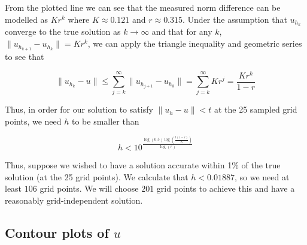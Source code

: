 \documentclass{article}
\numberwithin{equation}{section}
\theoremstyle{definition}
\begin{document}


From the plotted line we can see that the measured norm difference can be modelled as $Kr^k$ where $K \approx 0.121$ and $r \approx 0.315$. Under the assumption that $u_{h_k}$ converge to the true solution as $k \to \infty$ and that for any $k$, $\|u_{h_{k+1}} - u_{h_k}\| = Kr^k$, we can apply the triangle inequality and geometric series to see that

\begin{equation}
    \|u_{h_k} - u\| \leq \sum_{j=k}^{\infty} \|u_{h_{j+1}} - u_{h_{k}}\| = \sum_{j=k}^{\infty} Kr^j = \frac{Kr^k}{1-r}
\end{equation}

Thus, in order for our solution to satisfy $\|u_{h} - u\| < t$ at the 25 sampled grid points, we need $h$ to be smaller than

\begin{equation}
    h<10^{\frac{\log\left(0.5\right)\log\left(\frac{t\left(1-r\right)}{K}\right)}{\log\left(r\right)}}
\end{equation}

Thus, suppose we wished to have a solution accurate within 1\% of the true solution (at the 25 grid points). We calculate that $h < 0.01887$, so we need at least $106$ grid points. We will choose $201$ grid points to achieve this and have a reasonably grid-independent solution.

\subsection{Contour plots of $u$}
\end{document}
